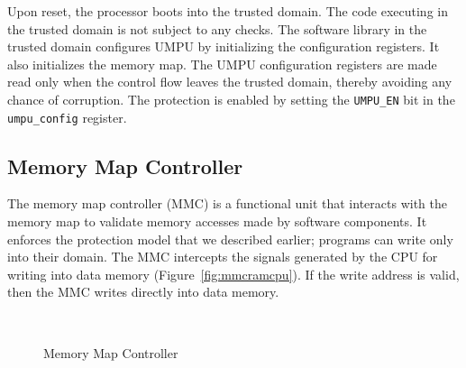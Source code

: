 Upon reset, the processor boots into the trusted domain.
%
The code executing in the trusted domain is not subject to any checks.
%
The software library in the trusted domain configures UMPU by
initializing the configuration registers.
%
It also initializes the memory map.
%
The UMPU configuration registers are made read only when the control
flow leaves the trusted domain, thereby avoiding any chance of
corruption.
%
The protection is enabled by setting the \texttt{UMPU\_EN} bit in the
\texttt{umpu\_config} register.
%
%
\subsection{Memory Map Controller}
\label{sec:mmc}
%
The memory map controller (MMC) is a functional unit that interacts with
the memory map to validate memory accesses made by software
components.
%
It enforces the protection model that we described earlier; programs
can write only into their domain.
%
The MMC intercepts the signals generated by the CPU for writing into
data memory (Figure~\ref{fig:mmcramcpu}).
%
If the write address is valid, then the MMC writes directly into data
memory.
%
%
\begin{figure}[htpb]
 \centering
  \mbox{
    \hspace{0.1in}
    \hspace{0.1in}
  }
  \caption{Memory Map Controller}
\end{figure}   
